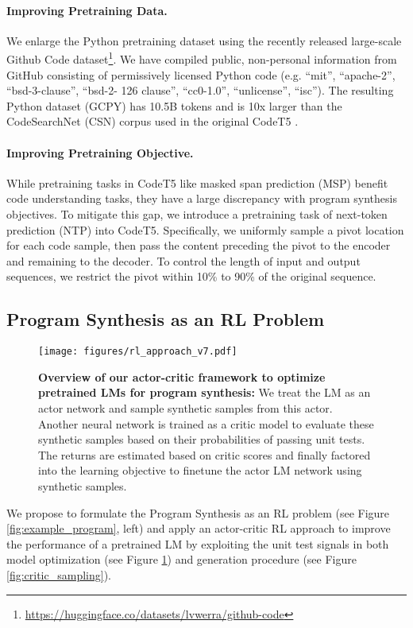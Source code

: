 \documentclass{article}
\begin{document}
\paragraph{Improving Pretraining Data.}
We enlarge the Python pretraining dataset using the recently released large-scale Github Code dataset\footnote{\url{https://huggingface.co/datasets/lvwerra/github-code}}. 
We have compiled public, non-personal information from GitHub consisting of permissively licensed Python code
(e.g. “mit”, “apache-2”, “bsd-3-clause”, “bsd-2- 126 clause”, “cc0-1.0”, “unlicense”, “isc”). The resulting Python dataset (GCPY) has 10.5B tokens and is 10x larger than the CodeSearchNet (CSN) corpus \citep{csn} used in the original CodeT5 \citep{codet5}.


\paragraph{Improving Pretraining Objective.}
While pretraining tasks in CodeT5 like masked span prediction (MSP) benefit code understanding tasks, they have a large discrepancy with program synthesis objectives.
To mitigate this gap, we introduce a pretraining task of next-token prediction (NTP) into CodeT5. Specifically, we uniformly sample a pivot location for each code sample, then pass the content preceding the pivot to the encoder and remaining to the decoder.
To control the length of input and output sequences, we restrict the pivot within 10\% to 90\% of the original sequence.  
\subsection{Program Synthesis as an RL Problem}
\label{subsec:rl_finetune}

\begin{figure}[t]
	\centering
	\resizebox{1.0\textwidth}{!} {
	\texttt{[image: figures/rl\_approach\_v7.pdf]}
	}
	\caption{
	\textbf{Overview of our actor-critic framework to optimize pretrained LMs for program synthesis:}
	We treat the LM as an actor network and sample synthetic samples from this actor.
	Another neural network is trained as a critic model to evaluate these synthetic samples based on their probabilities of passing unit tests. 
	The returns are estimated based on critic scores and finally factored into the learning objective  to finetune the actor LM network using synthetic samples. 
	}
	\label{fig:rl_approach}
\end{figure}

We propose to formulate the Program Synthesis as an RL problem (see Figure \ref{fig:example_program}, left) and apply an actor-critic RL approach to improve the performance of a pretrained LM by exploiting the unit test signals in both model optimization (see Figure \ref{fig:rl_approach}) and generation procedure (see Figure \ref{fig:critic_sampling}). 
\end{document}
